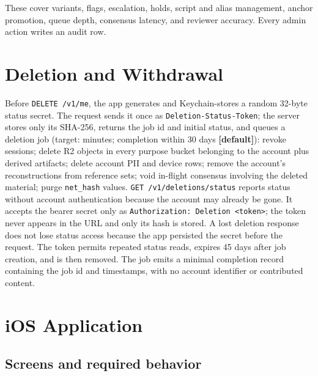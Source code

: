 \documentclass[11pt]{article}
\newcommand{\code}[1]{\texttt{#1}}
\begin{document}
These cover variants, flags, escalation, holds, script and alias management, anchor
promotion, queue depth, consensus latency, and reviewer accuracy. Every admin action
writes an audit row.

\section{Deletion and Withdrawal}
\label{sec:deletion}

Before \code{DELETE /v1/me}, the app generates and Keychain-stores a random 32-byte
status secret. The request sends it once as \code{Deletion-Status-Token}; the server
stores only its SHA-256, returns the job id and initial status, and queues a deletion
job (target: minutes; completion within 30 days \textbf{[default]}): revoke sessions; delete R2
objects in every purpose bucket belonging to the account plus derived artifacts; delete
account PII and device rows; remove the account's reconstructions from reference
sets; void in-flight consensus involving the deleted material; purge
\code{net\_hash} values.
\code{GET /v1/deletions/status} reports status without account authentication because
the account may already be gone. It accepts the bearer secret only as
\code{Authorization: Deletion <token>}; the token never appears in the URL and only
its hash is stored. A lost deletion response does not lose status access because the
app persisted the secret before the request. The token permits repeated status reads,
expires 45 days after job creation, and is then removed. The job emits a
minimal completion record containing the job id and timestamps, with no account
identifier or contributed content.

\section{iOS Application}

\subsection{Screens and required behavior}
\end{document}
